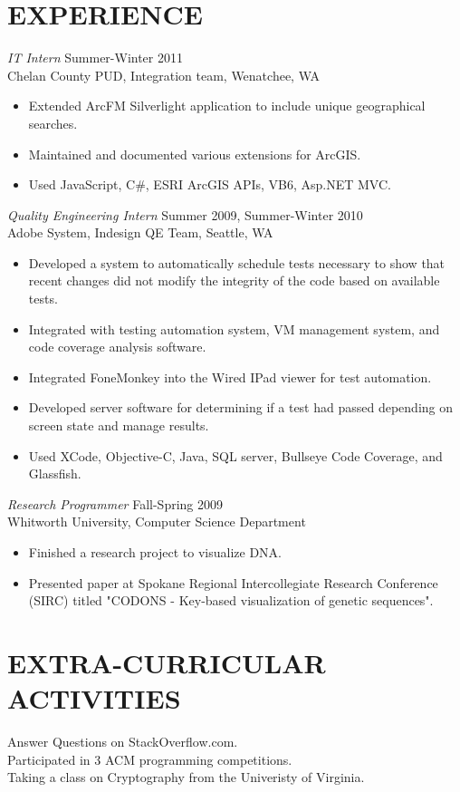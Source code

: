 \documentclass[line]{res}
\begin{document}
\begin{resume}
\section{EXPERIENCE} 
 				{\sl IT Intern} \hfill Summer-Winter 2011\\
				Chelan County PUD, Integration team, Wenatchee, WA
                 \begin{itemize}  \itemsep -2pt %
					 \item Extended	ArcFM Silverlight application to include unique geographical searches.
					 \item Maintained and documented various extensions for ArcGIS.
					 \item Used JavaScript, C\#, ESRI ArcGIS APIs, VB6, Asp.NET MVC.
				 \end{itemize}
				 
				{\sl Quality Engineering Intern} \hfill Summer 2009, Summer-Winter 2010 \\
                Adobe System, Indesign QE Team, Seattle, WA
                 \begin{itemize}  \itemsep -2pt %
	                 \item Developed a system to automatically schedule tests necessary to show that recent changes did not modify the integrity of the code based on available tests.
	                \item Integrated with testing automation system, VM management system, and code coverage analysis software.
	                 \item Integrated FoneMonkey into the Wired IPad viewer for test automation.
	                 \item Developed server software for determining if a test had passed depending on screen state and manage results.
	                 \item Used XCode, Objective-C, Java, SQL server, Bullseye Code Coverage, and Glassfish.
 				 \end{itemize}
 								 
                {\sl Research Programmer} \hfill             Fall-Spring 2009 \\
                Whitworth University, Computer Science Department
                 \begin{itemize}  \itemsep -2pt %
	                 \item Finished a research project to visualize DNA.
	                 \item Presented paper at Spokane Regional Intercollegiate Research Conference (SIRC) titled "CODONS - Key-based visualization of genetic sequences".
                 \end{itemize} 				
                 				
\section{EXTRA-CURRICULAR ACTIVITIES}
	Answer Questions on StackOverflow.com.\\
	Participated in 3 ACM programming competitions.\\
	Taking a class on Cryptography from the Univeristy of Virginia.\\
\end{resume}
\end{document}
